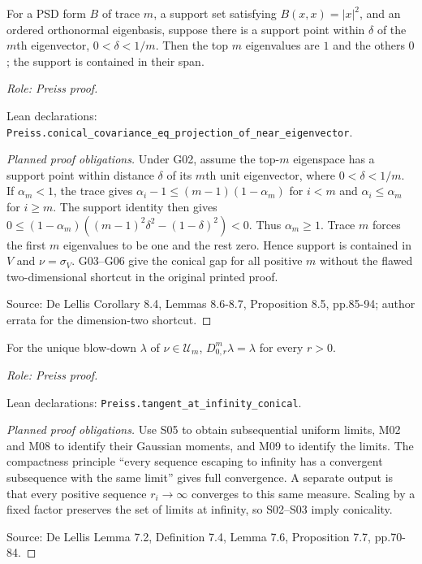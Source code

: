 \begin{lemma}
\label{lem:conical-eigenvalue-rigidity}




For a PSD form $B$ of trace $m$, a support set satisfying $B(x,x)=|x|^2$, and an ordered orthonormal eigenbasis, suppose there is a support point within $\delta$ of the $m$th eigenvector, $0<\delta<1/m$. Then the top $m$ eigenvalues are $1$ and the others $0$; the support is contained in their span.
\par\emph{Role: Preiss proof.}
\par Lean declarations: \texttt{Preiss.conical\_covariance\_eq\_projection\_of\_near\_eigenvector}.
\end{lemma}
\begin{proof}[Planned proof obligations]

Under G02, assume the top-$m$ eigenspace has a support point within distance
$\delta$ of its $m$th unit eigenvector, where $0<\delta<1/m$.
If $\alpha_m<1$, the trace gives
$\alpha_i-1\leq(m-1)(1-\alpha_m)$ for $i<m$ and
$\alpha_i\leq\alpha_m$ for $i\geq m$.
The support identity then gives
$0\leq(1-\alpha_m)((m-1)^2\delta^2-(1-\delta)^2)<0$.
Thus $\alpha_m\geq1$. Trace $m$ forces the first $m$ eigenvalues to be one
and the rest zero. Hence support is contained in $V$ and $\nu=\sigma_V$.
G03--G06 give the conical gap for all positive $m$ without the flawed
two-dimensional shortcut in the original printed proof.
\par Source: De Lellis Corollary 8.4, Lemmas 8.6-8.7, Proposition 8.5, pp.85-94; author errata for the dimension-two shortcut.
\end{proof}

\begin{corollary}
\label{cor:conical}




For the unique blow-down $\lambda$ of $\nu\in\mathcal U_m$, $D^m_{0,r}\lambda=\lambda$ for every $r>0$.
\par\emph{Role: Preiss proof.}
\par Lean declarations: \texttt{Preiss.tangent\_at\_infinity\_conical}.
\end{corollary}
\begin{proof}[Planned proof obligations]

Use S05 to obtain subsequential uniform limits, M02 and M08 to identify their
Gaussian moments, and M09 to identify the limits. The compactness principle
``every sequence escaping to infinity has a convergent subsequence with the
same limit'' gives full convergence. A separate output is that every positive
sequence $r_i\to\infty$ converges to this same measure. Scaling by a fixed
factor preserves the set of limits at infinity, so S02--S03 imply conicality.
\par Source: De Lellis Lemma 7.2, Definition 7.4, Lemma 7.6, Proposition 7.7, pp.70-84.
\end{proof}

